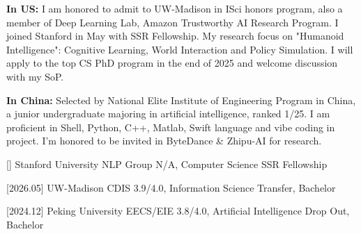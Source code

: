 \documentclass[zh]{resume}
\begin{document}
\makeheader

\textbf{In US:} I am honored to admit to UW-Madison in ISci honors program, also a member of Deep Learning Lab, Amazon Trustworthy AI Research Program. I joined Stanford in May with SSR Fellowship. My research focus on "Humanoid Intelligence": Cognitive Learning, World Interaction and Policy Simulation. I will apply to the top CS PhD program in the end of 2025 and welcome discussion with my SoP.%

\textbf{In China:} Selected by National Elite Institute of Engineering Program in China, a junior undergraduate majoring in artificial intelligence, ranked 1/25. I am proficient in Shell, Python, C++, Matlab, Swift language and vibe coding in project. I'm honored to be invited in ByteDance \& Zhipu-AI for research.

 


\begin{educations}
  \education%
    {}%
    []%
    {Stanford University}%
    {NLP Group}%
    {N/A, Computer Science}%
    {SSR Fellowship}

  \separator{0.5ex}
  
  \education%
    {}%
    [2026.05]%
    {UW-Madison}%
    {CDIS}%
    {3.9/4.0, Information Science}%
    {Transfer, Bachelor}

  \separator{0.5ex}
  \education%
    {}%
    [2024.12]%
    {Peking University}%
    {EECS/EIE}%
    {3.8/4.0, Artificial Intelligence}%
    {Drop Out, Bachelor}
\end{educations}
\end{document}
